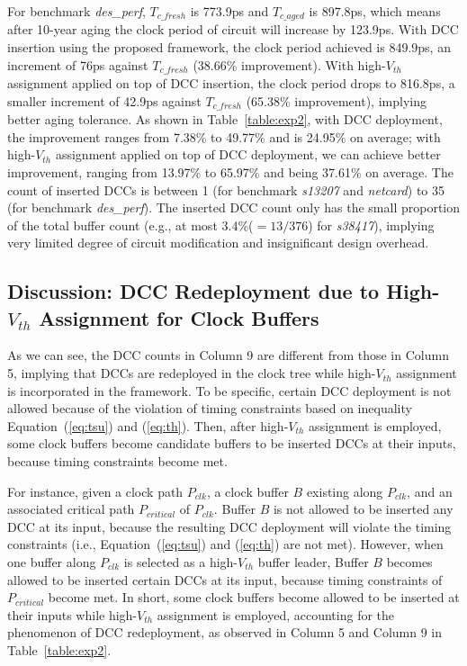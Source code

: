 For benchmark \textit{des\_perf}, $T_{c\_fresh}$ is 773.9ps and $T_{c\_aged}$ is 897.8ps, which means after 10-year aging the clock period of circuit will increase by 123.9ps. With DCC insertion using the proposed framework, the clock period achieved is 849.9ps, an increment of 76ps against $T_{c\_fresh}$ (38.66\% improvement). With high-$V_{th}$ assignment applied on top of DCC insertion, the clock period drops to 816.8ps, a smaller increment of 42.9ps against $T_{c\_fresh}$ (65.38\% improvement), implying better aging tolerance. As shown in Table~\ref{table:exp2}, with DCC deployment, the improvement ranges from 7.38\% to 49.77\% and is 24.95\% on average; with high-$V_{th}$ assignment applied on top of DCC deployment, we can achieve better improvement, ranging from 13.97\% to 65.97\% and being 37.61\% on average. The count of inserted DCCs is between 1 (for benchmark \textit{s13207} and \textit{netcard}) to 35 (for benchmark \textit{des\_perf}). The inserted DCC count only has the small proportion of the total buffer count (e.g., at most 3.4\%($= 13/376$) for \textit{s38417}), implying very limited degree of circuit modification and insignificant design overhead. %

\subsection{Discussion: DCC Redeployment due to High-$V_{th}$ Assignment for Clock Buffers}
As we can see, the DCC counts in Column 9 are different from those in Column 5, implying that DCCs are redeployed in the clock tree while high-$V_{th}$ assignment is incorporated in the framework. 
To be specific, certain DCC deployment is not allowed because of the violation of timing constraints based on inequality Equation~(\ref{eq:tsu}) and (\ref{eq:th}). Then, after high-$V_{th}$ assignment is employed, some clock buffers become candidate buffers to be inserted DCCs at their inputs, because timing constraints become met. 

For instance, given a clock path $P_{clk}$, a clock buffer $B$ existing along $P_{clk}$, and an associated critical path $P_{critical}$ of $P_{clk}$. Buffer $B$ is not allowed to be inserted any DCC at its input, because the resulting DCC deployment will violate the timing constraints (i.e., Equation~(\ref{eq:tsu}) and (\ref{eq:th}) are not met). However, when one buffer along $P_{clk}$ is selected as a high-$V_{th}$ buffer leader, Buffer $B$ becomes allowed to be inserted certain DCCs at its input, because timing constraints of $P_{critical}$ become met. In short, some clock buffers become allowed to be inserted at their inputs while high-$V_{th}$ assignment is employed, accounting for the phenomenon of DCC redeployment, as observed in Column 5 and Column 9 in Table~\ref{table:exp2}.

